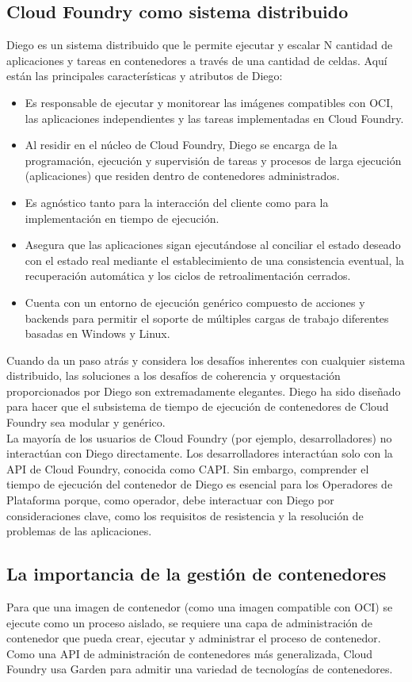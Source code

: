\documentclass[a4paper,11pt]{article}
\begin{document}
\subsection{Cloud Foundry como sistema distribuido}
Diego es un sistema distribuido que le permite ejecutar y escalar N cantidad de aplicaciones y tareas en contenedores a través de una cantidad de celdas. Aquí están las principales características y atributos de Diego:
\begin{itemize}
  \item Es responsable de ejecutar y monitorear las imágenes compatibles con OCI, las aplicaciones independientes y las tareas implementadas en Cloud Foundry.
\item Al residir en el núcleo de Cloud Foundry, Diego se encarga de la programación, ejecución y supervisión de tareas y procesos de larga ejecución (aplicaciones) que residen dentro de contenedores administrados.
\item Es agnóstico tanto para la interacción del cliente como para la implementación en tiempo de ejecución.
\item Asegura que las aplicaciones sigan ejecutándose al conciliar el estado deseado con el estado real mediante el establecimiento de una consistencia eventual, la recuperación automática y los ciclos de retroalimentación cerrados.
\item Cuenta con un entorno de ejecución genérico compuesto de acciones y backends para permitir el soporte de múltiples cargas de trabajo diferentes basadas en Windows y Linux.
\end{itemize}

Cuando da un paso atrás y considera los desafíos inherentes con cualquier sistema distribuido, las soluciones a los desafíos de coherencia y orquestación proporcionados por Diego son extremadamente elegantes. Diego ha sido diseñado para hacer que el subsistema de tiempo de ejecución de contenedores de Cloud Foundry sea modular y
genérico.\\
La mayoría de los usuarios de Cloud Foundry (por ejemplo, desarrolladores) no interactúan con Diego directamente. Los desarrolladores interactúan solo con la API de Cloud Foundry,
conocida como CAPI. Sin embargo, comprender el tiempo de ejecución del contenedor de Diego es esencial para los Operadores de Plataforma porque, como operador, debe interactuar con Diego por consideraciones clave, como los requisitos de resistencia y la resolución de problemas de las aplicaciones.

\subsection{La importancia de la gestión de contenedores}
Para que una imagen de contenedor (como una imagen compatible con OCI) se ejecute como un proceso aislado, se requiere una capa de administración de contenedor que pueda crear, ejecutar y administrar el proceso de contenedor. Como una API de administración de
contenedores más generalizada, Cloud Foundry usa Garden para admitir una variedad de tecnologías de contenedores.\\
\end{document}
